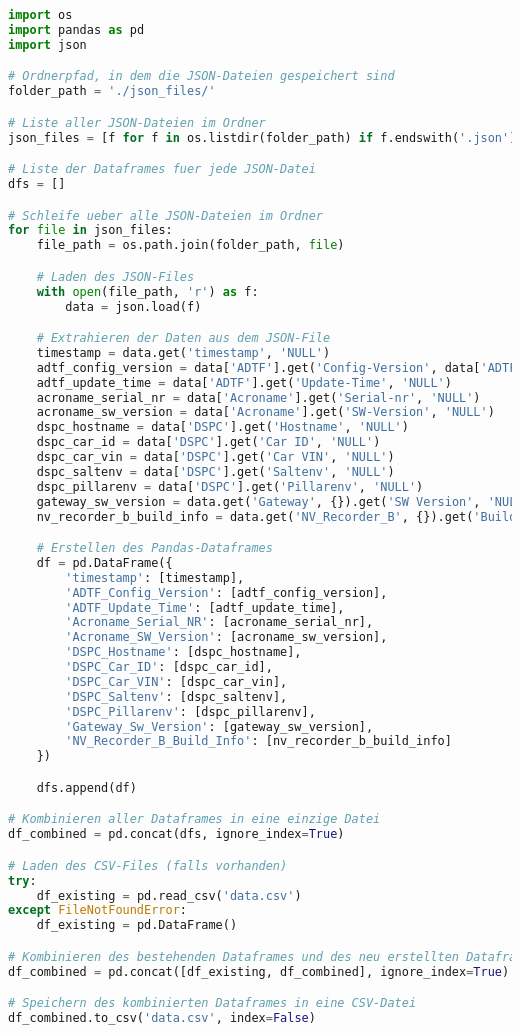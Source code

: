 \begin{lstlisting}[language=Python, caption=ChatGPT generierter Python-Code json-to-csv, label=json-to-csv]
import os
import pandas as pd
import json

# Ordnerpfad, in dem die JSON-Dateien gespeichert sind
folder_path = './json_files/'

# Liste aller JSON-Dateien im Ordner
json_files = [f for f in os.listdir(folder_path) if f.endswith('.json')]

# Liste der Dataframes fuer jede JSON-Datei
dfs = []

# Schleife ueber alle JSON-Dateien im Ordner
for file in json_files:
    file_path = os.path.join(folder_path, file)

    # Laden des JSON-Files
    with open(file_path, 'r') as f:
        data = json.load(f)

    # Extrahieren der Daten aus dem JSON-File
    timestamp = data.get('timestamp', 'NULL')
    adtf_config_version = data['ADTF'].get('Config-Version', data['ADTF'].get('Config1Version', 'NULL'))
    adtf_update_time = data['ADTF'].get('Update-Time', 'NULL')
    acroname_serial_nr = data['Acroname'].get('Serial-nr', 'NULL')
    acroname_sw_version = data['Acroname'].get('SW-Version', 'NULL')
    dspc_hostname = data['DSPC'].get('Hostname', 'NULL')
    dspc_car_id = data['DSPC'].get('Car ID', 'NULL')
    dspc_car_vin = data['DSPC'].get('Car VIN', 'NULL')
    dspc_saltenv = data['DSPC'].get('Saltenv', 'NULL')
    dspc_pillarenv = data['DSPC'].get('Pillarenv', 'NULL')
    gateway_sw_version = data.get('Gateway', {}).get('SW Version', 'NULL')
    nv_recorder_b_build_info = data.get('NV_Recorder_B', {}).get('Build Info', 'NULL')

    # Erstellen des Pandas-Dataframes
    df = pd.DataFrame({
        'timestamp': [timestamp],
        'ADTF_Config_Version': [adtf_config_version],
        'ADTF_Update_Time': [adtf_update_time],
        'Acroname_Serial_NR': [acroname_serial_nr],
        'Acroname_SW_Version': [acroname_sw_version],
        'DSPC_Hostname': [dspc_hostname],
        'DSPC_Car_ID': [dspc_car_id],
        'DSPC_Car_VIN': [dspc_car_vin],
        'DSPC_Saltenv': [dspc_saltenv],
        'DSPC_Pillarenv': [dspc_pillarenv],
        'Gateway_Sw_Version': [gateway_sw_version],
        'NV_Recorder_B_Build_Info': [nv_recorder_b_build_info]
    })

    dfs.append(df)

# Kombinieren aller Dataframes in eine einzige Datei
df_combined = pd.concat(dfs, ignore_index=True)

# Laden des CSV-Files (falls vorhanden)
try:
    df_existing = pd.read_csv('data.csv')
except FileNotFoundError:
    df_existing = pd.DataFrame()

# Kombinieren des bestehenden Dataframes und des neu erstellten Dataframes
df_combined = pd.concat([df_existing, df_combined], ignore_index=True)

# Speichern des kombinierten Dataframes in eine CSV-Datei
df_combined.to_csv('data.csv', index=False)

\end{lstlisting}



